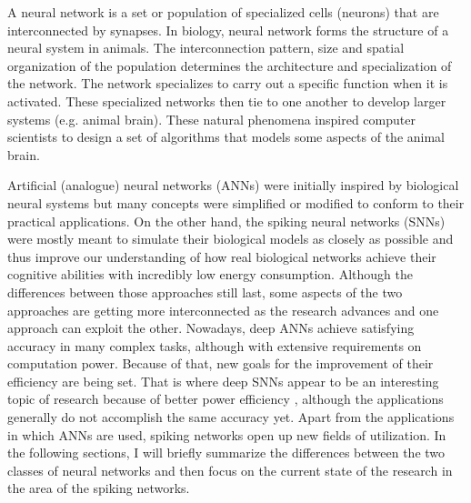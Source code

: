 A neural network is a set or population of specialized cells (neurons) that are interconnected by synapses. In biology, neural network forms the structure of a neural system in animals. The interconnection pattern, size and spatial organization of the population determines the architecture and specialization of the network. The network specializes to carry out a specific function when it is activated. These specialized networks then tie to one another to develop larger systems (e.g. animal brain). These natural phenomena inspired computer scientists to design a set of algorithms that models some aspects of the animal brain. 

Artificial (analogue) neural networks (ANNs) were initially inspired by biological neural systems but many concepts were simplified or modified to conform to their practical applications. On the other hand, the spiking neural networks (SNNs) were mostly meant to simulate their biological models as closely as possible and thus improve our understanding of how real biological networks achieve their cognitive abilities with incredibly low energy consumption. Although the differences between those approaches still last, some aspects of the two approaches are getting more interconnected as the research advances and one approach can exploit the other. Nowadays, deep ANNs achieve satisfying accuracy in many complex tasks, although with extensive requirements on computation power. Because of that, new goals for the improvement of their efficiency are being set. That is where deep SNNs appear to be an interesting topic of research because of better power efficiency \cite{caoSpikingDeepConvolutional2015, tavanaeiDeepLearningSpiking2019}, although the applications generally do not accomplish the same accuracy yet. Apart from the applications in which ANNs are used, spiking networks open up new fields of utilization. In the following sections, I will briefly summarize the differences between the two classes of neural networks and then focus on the current state of the research in the area of the spiking networks.

